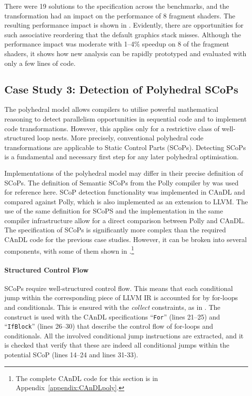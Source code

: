     There were 19 solutions to the specification across the benchmarks, and
    the transformation had an impact on the performance of 8 fragment shaders.
    The resulting performance impact is shown in .
    Evidently, there are opportunities for such associative reordering that
    the default graphics stack misses.
    Although the performance impact was moderate with 1--4\% speedup on 8
    of the fragment shaders, it shows how new analysis can be rapidly prototyped
    and evaluated with only a few lines of code.

\subsection{Case Study 3: Detection of Polyhedral SCoPs}

    The polyhedral model
    \citep{Karp:1967:OCU:321406.321418,benabderrahmane2010polyhedral} allows
    compilers to utilise powerful mathematical reasoning to detect parallelism
    opportunities in sequential code and to implement code transformations.
    However, this applies only for a restrictive class of well-structured loop
    nests.
    More precisely, conventional polyhedral code transformations are applicable
    to Static Control Parts (SCoPs).
    Detecting SCoPs is a fundamental and necessary first step for any later
    polyhedral optimisation.

    Implementations of the polyhedral model may differ in their precise
    definition of SCoPs.
    The definition of Semantic SCoPs from the Polly compiler by
    \citet{Lengauer2012Polly} was used for reference here.
    SCoP detection functionality was implemented in CAnDL and compared against
    Polly, which is also implemented as an extension to LLVM.
    The use of the same definition for SCoPS and the implementation in the same
    compiler infrastructure allow for a direct comparison between Polly and
    CAnDL.
    The specification of SCoPs is significantly more complex than the required
    CAnDL code for the previous case studies.
    However, it can be broken into several components, with some of them shown
    in .\footnote{The complete CAnDL code for this section
    is in Appendix~\ref{appendix:CAnDLpoly}.}

    \paragraph*{Structured Control Flow}
    SCoPs require well-structured control flow.
    This means that each conditional jump within the
    corresponding piece of LLVM IR is accounted for by for-loops and
    conditionals.
    This is ensured with the {\it collect} constraints, as in
    .
    The construct is used with the CAnDL specifications ``\texttt{For}''
    (lines 21--25) and ``\texttt{IfBlock}'' (lines 26--30) that describe the
    control flow of for-loops and conditionals.
    All the involved conditional jump instructions are extracted, and it is
    checked that verify that these are indeed all conditional jumps within the
    potential SCoP (lines 14--24 and lines 31-33).

